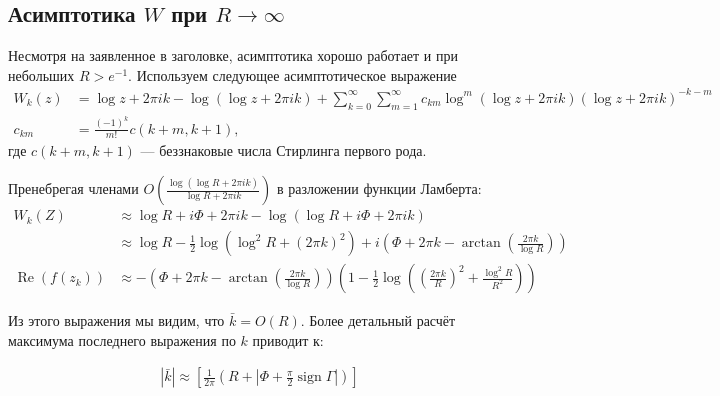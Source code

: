 \documentclass[a4paper, 12pt]{article}
\DeclareMathOperator*{\sign}{sign}
\DeclareMathOperator*{\Real}{Re}
\newenvironment{eqw}{\begin{equation} \begin{aligned}}   
    {\end{aligned}    \end{equation}}
\begin{document}
\subsection*{Асимптотика $W$ при $R \to \infty$}
Несмотря на заявленное в заголовке, асимптотика хорошо работает и при небольших $R>e^{-1}$. Используем следующее асимптотическое выражение \cite[formula 4.20]{corless1996lambertw}
\begin{eqw}
    W_k(z) &= \log z + 2\pi i k - \log\left(\log z + 2\pi i k\right) + \sum\limits_{k=0}^{\infty}\sum\limits_{m=1}^{\infty} c_{km}\log^m\left(\log z + 2\pi i k\right)\left(\log z + 2\pi i k \right)^{-k-m}\\
    c_{km} &= \frac{(-1)^k}{m!} c(k+m, k+1),
\end{eqw}
где $c(k+m, k+1)$ ---  беззнаковые числа Стирлинга первого рода.



Пренебрегая членами $O\left(\frac{\log\left(\log R + 2\pi i k\right)}{\log R  + 2\pi i k}\right)$ в разложении функции Ламберта:
\begin{eqw}
    W_k\left(Z\right) &\approx \log R + i\Phi + 2\pi i k - \log\left(\log R + i\Phi+ 2\pi i k\right) \\
    &\approx \log R - \frac{1}{2}\log\left(\log^2 R + (2\pi k)^2\right) + 
    i\left(\Phi + 2\pi k - \arctan\left(\frac{2\pi k}{\log R}\right)\right) \\
    \Real\left(f(z_k)\right) &\approx
    -\left(\Phi + 2\pi k - \arctan\left(\frac{2\pi k}{\log R}\right)\right)\left(1-
    \frac{1}{2}\log \left(\left(\frac{2\pi k}{R}\right)^2+\frac{\log^2 R}{R^2}\right)
    \right)
\end{eqw}

Из этого выражения мы видим, что $\bar k = O(R)$. Более детальный расчёт максимума последнего выражения по $k$ приводит к:

\begin{eqw}\label{optimal_k}
    |\bar k|\approx \left[ \frac{1}{2\pi}\left(R + \left|\Phi + \frac{\pi}{2}\sign \Gamma\right|\right)\right]
\end{eqw}
\end{document}
